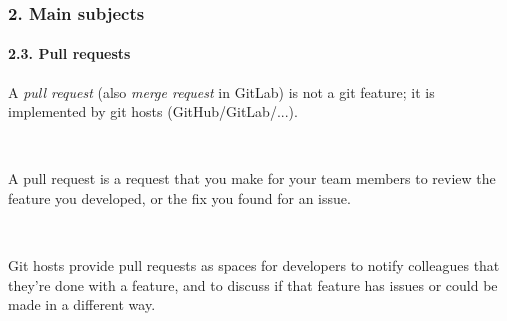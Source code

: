 \documentclass[dvipsnames]{beamer}
\begin{document}
\begin{frame}
\frametitle{2. Main subjects}
\framesubtitle{2.3. Pull requests}

A \textit{pull request} (also \textit{merge request} in GitLab) is not a git feature; it is implemented by git hosts (GitHub/GitLab/...).

~

A pull request is a request that you make for your team members to review the feature you developed, or the fix you found for an issue.

~

Git hosts provide pull requests as spaces for developers to notify colleagues that they're done with a feature, and to discuss if that feature has issues or could be made in a different way.

\end{frame}
\end{document}
